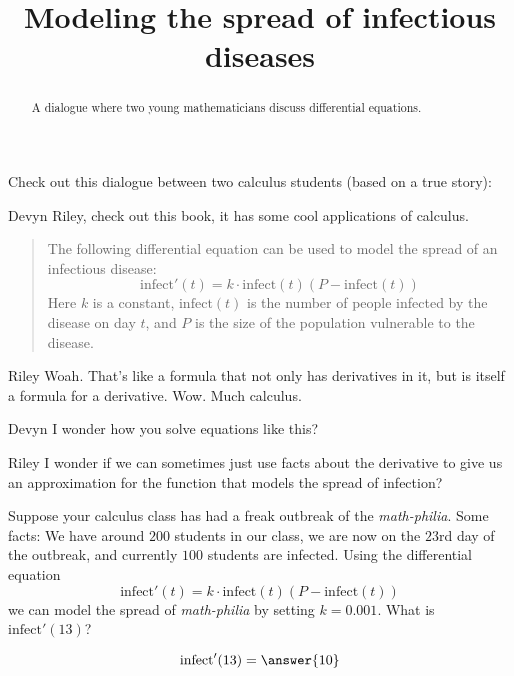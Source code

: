\documentclass{ximera}
\title[Break-Ground:]{Modeling the spread of infectious diseases}
\begin{document}
\begin{abstract}
  A dialogue where two young mathematicians discuss differential equations.
\end{abstract}
\maketitle







Check out this dialogue between two calculus students (based on a true
story):

\begin{dialogue}
\item[Devyn] Riley, check out this book, it has some cool applications
  of calculus.
\begin{quote}
  The following differential equation can be used to model the spread
  of an infectious disease:
  \[
  \mathrm{infect}'(t) = k\cdot \mathrm{infect}(t)(P-\mathrm{infect}(t))
  \]
  Here $k$ is a constant, $\mathrm{infect}(t)$ is the number of people
  infected by the disease on day $t$, and $P$ is the size of the
  population vulnerable to the disease.
\end{quote}
\item[Riley] Woah. That's like a formula that not only has derivatives
  in it, but is itself a formula for a derivative. Wow. Much calculus. 
\item[Devyn] I wonder how you solve equations like this?
\item[Riley] I wonder if we can sometimes just use facts about the
  derivative to give us an approximation for the function that models the spread of infection?
\end{dialogue}



\begin{problem}
  Suppose your calculus class has had a freak outbreak of the
  \textit{math-philia}. Some facts: We have around $200$ students in
  our class, we are now on the $23$rd day of the outbreak, and currently $100$ students are infected. Using the differential
  equation
  \[
  \mathrm{infect}'(t) = k\cdot \mathrm{infect}(t)(P-\mathrm{infect}(t))
  \]
  we can model the spread of \textit{math-philia} by setting $k=0.001$.
  What is $\mathrm{infect}'(13)$?
  \begin{prompt}
    \[
    \mathrm{infect}'(13) = \answer{10}
    \]
  \end{prompt}
\end{problem}
\end{document}
